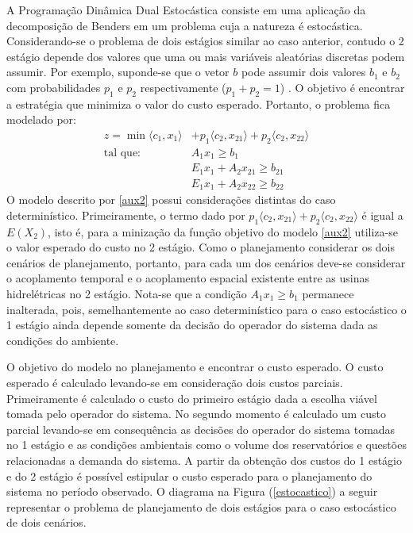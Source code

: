 A Programa\c c\~ao Din\^amica Dual Estoc\'astica consiste em uma aplica\c c\~ao da decomposi\c c\~ao de Benders em um problema cuja a
natureza \'e
estoc\'astica. Considerando-se o problema de dois est\'agios similar ao caso anterior, contudo o 2 est\'agio depende dos valores
que uma ou mais vari\'aveis aleat\'orias discretas podem assumir. Por exemplo, suponde-se que o vetor $b$ pode assumir dois
valores $b_1$ e $b_2$ com
probabilidades $p_1$ e $p_2$ respectivamente ($p_1 + p_2 = 1$) \cite{cp}. O objetivo \'e encontrar a estrat\'egia que minimiza o
valor do custo esperado. Portanto, o problema fica modelado por:
\begin{align}
	\label{aux2}
  z = \min  \langle c_1,x_1\rangle &+ p_1\langle c_2,x_{21}\rangle + p_2\langle c_2,x_{22}\rangle \nonumber\\	
 \mbox{tal que: }&	A_1 x_1 \geq b_1 \\
	&E_1 x_1 + A_2 x_{21} \geq b_{21} \nonumber\\
	&E_1 x_1 + A_2x_{22} \geq b_{22} \nonumber
\end{align}
O modelo descrito por \ref{aux2} possui considera\c c\~oes distintas do caso determin\'istico. Primeiramente, o termo
dado por $p_1\langle c_2,x_{21}\rangle + p_2\langle c_2,x_{22}\rangle $ \'e igual a $E(X_2)$, isto \'e, para a miniza\c c\~ao da
fun\c c\~ao objetivo do modelo \ref{aux2} utiliza-se o valor esperado do custo no 2 est\'agio. Como o planejamento
considerar os dois cen\'arios de planejamento, portanto, para cada um dos cen\'arios deve-se considerar o acoplamento
temporal e o acoplamento espacial existente entre as usinas hidrel\'etricas no 2 est\'agio. Nota-se que a condi\c c\~ao
$A_1 x_1 \geq b_1$ permanece inalterada, pois, semelhantemente ao caso determin\'istico para o caso estoc\'astico o
1 est\'agio ainda depende somente da decis\~ao do operador do sistema dada as condi\c c\~oes do ambiente. 

O objetivo do
modelo no planejamento e encontrar o custo esperado. O custo esperado \'e calculado levando-se em considera\c c\~ao dois
custos parciais. Primeiramente \'e calculado o custo do primeiro est\'agio dada a escolha vi\'avel tomada pelo
operador do sistema. No segundo momento \'e calculado um custo parcial levando-se em consequ\^encia as decis\~oes do
operador do sistema tomadas no 1 est\'agio e as condi\c c\~oes ambientais como o volume dos reservat\'orios e quest\~oes 
relacionadas a demanda do sistema. A partir da obten\c c\~ao dos custos do 1 est\'agio e do 2 est\'agio \'e poss\'ivel
estipular o custo esperado para o planejamento do sistema no per\'iodo observado. 
O diagrama na Figura (\ref{estocastico}) a seguir representar o problema de planejamento de dois est\'agios para o caso
estoc\'astico de dois cen\'arios.


